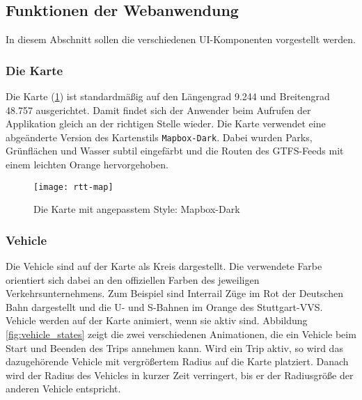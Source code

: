 \subsection{Funktionen der Webanwendung}
\label{sub:funktionen_der_webanwendung}
  In diesem Abschnitt sollen die verschiedenen UI-Komponenten vorgestellt werden.

  \subsubsection*{Die Karte}
  \label{ssub:die_karte}
    Die Karte (\ref{fig:map}) ist standardmäßig auf den Längengrad 9.244 und Breitengrad 48.757 ausgerichtet. Damit findet sich der Anwender beim Aufrufen der Applikation gleich an der richtigen Stelle wieder. Die Karte verwendet eine abgeänderte Version des Kartenstils \texttt{Mapbox-Dark}. Dabei wurden Parks, Grünflächen und Wasser subtil eingefärbt und die Routen des GTFS-Feeds mit einem leichten Orange hervorgehoben.

    \begin{figure}[htbp]
      \begin{center}
        \texttt{[image: rtt-map]}
        \caption{Die Karte mit angepasstem Style: Mapbox-Dark}
        \label{fig:map}
      \end{center}
    \end{figure}
    

  \subsubsection*{Vehicle}
  \label{ssub:vehicle_auf_karte}
    Die Vehicle sind auf der Karte als Kreis dargestellt. Die verwendete Farbe orientiert sich dabei an den offiziellen Farben des jeweiligen Verkehrsunternehmens. Zum Beispiel sind Interrail Züge im Rot der Deutschen Bahn dargestellt und die U- und S-Bahnen im Orange des Stuttgart-VVS.\\

    Vehicle werden auf der Karte animiert, wenn sie aktiv sind. Abbildung \ref{fig:vehicle_states} zeigt die zwei verschiedenen Animationen, die ein Vehicle beim Start und Beenden des Trips annehmen kann. Wird ein Trip aktiv, so wird das dazugehörende Vehicle mit vergrößertem Radius auf die Karte platziert. Danach wird der Radius des Vehicles in kurzer Zeit verringert, bis er der Radiusgröße der anderen Vehicle entspricht.

